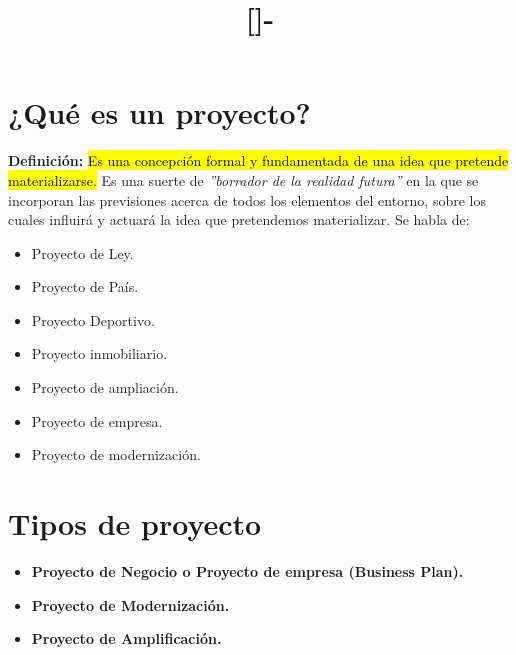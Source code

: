 \documentclass{templateNote}
\newcommand{\newparagraph}{\par\vspace{\baselineskip}\noindent}
\newcommand{\hlcolor}[2]{{\sethlcolor{#1}\hl{#2}}}
\begin{document}

\title{[\asignatura]-\titulo}
\author{
    \autor
}
\portada
\margenes %

\section{¿Qué es un proyecto?}
\textbf{Definición:} \hlcolor{Amarillo!50}{Es una concepción formal y fundamentada de una idea que pretende materializarse.} Es una suerte de \textit{''borrador de la realidad futura''} en la que se incorporan las previsiones acerca de todos los elementos del entorno, sobre los cuales influirá y actuará la idea que pretendemos materializar.
\newline
Se habla de:\newparagraph

\begin{minipage}[t]{0.45\textwidth}
  \begin{itemize}
    \item Proyecto de Ley.
    \item Proyecto de País.
    \item Proyecto Deportivo.
    \item Proyecto inmobiliario.
  \end{itemize}
\end{minipage}
\begin{minipage}[t]{0.45\textwidth}
  \begin{itemize}
    \item Proyecto de ampliación.
    \item Proyecto de empresa.
    \item Proyecto de modernización.
  \end{itemize}
\end{minipage}

\section{Tipos de proyecto}
\begin{itemize}
  \item \textbf{Proyecto de Negocio o Proyecto de empresa (Business Plan).}
  \item \textbf{Proyecto de Modernización.}
  \item \textbf{Proyecto de Amplificación.}
\end{itemize}
\end{document}
